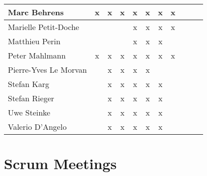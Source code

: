 \documentclass[a4paper, 11pt]{article}
\begin{document}
\begin{tabular}{|l|c|c|c|c||c|c|c||c|c|c|}
Marc Behrens         & x & x & x & x & x & x & x \\\hline
Marielle Petit-Doche &   &   &   & x & x & x & x \\\hline
Matthieu Perin       &   &   &   & x & x & x &   \\\hline
Peter Mahlmann       & x & x & x & x & x & x & x \\\hline
Pierre-Yves Le Morvan &   & x & x & x & x &   &   \\\hline
Stefan Karg          &   & x & x & x & x & x &   \\\hline
Stefan Rieger        &   & x & x & x & x & x &   \\\hline
Uwe Steinke          &   & x & x & x & x & x &   \\\hline
Valerio D'Angelo     &   & x & x & x & x & x &   \\\hline
\end{tabular}


\section{Scrum Meetings}
\end{document}

